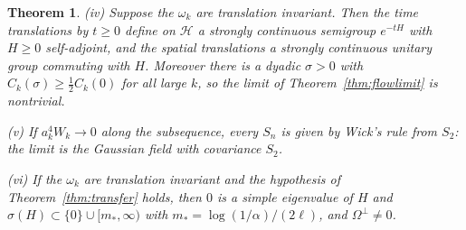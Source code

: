 \documentclass[aps,prd,twocolumn,superscriptaddress,nofootinbib,longbibliography,floatfix,amsmath,amssymb,10pt]{revtex4-2}
\newtheorem{theorem}{Theorem}
\theoremstyle{definition}
\theoremstyle{remark}
\begin{document}
\begin{theorem}
\textup{(iv)} Suppose the $\omega_k$ are translation invariant. Then the
time translations by $t\ge0$ define on $\mathcal H$ a strongly continuous
semigroup $e^{-tH}$ with $H\ge0$ self-adjoint, and the spatial translations a
strongly continuous unitary group commuting with $H$. Moreover there is a
dyadic $\sigma>0$ with $C_k(\sigma)\ge\frac12C_k(0)$ for all large $k$, so
the limit of Theorem~\textup{\ref{thm:flowlimit}} is nontrivial.

\textup{(v)} If $a_k^4W_k\to0$ along the subsequence, every $S_n$ is given by
Wick's rule from $S_2$: the limit is the Gaussian field with covariance $S_2$.

\textup{(vi)} If the $\omega_k$ are translation invariant and the
hypothesis of Theorem~\textup{\ref{thm:transfer}} holds, then $0$ is a simple
eigenvalue of $H$ and $\sigma(H)\subset\{0\}\cup[m_*,\infty)$ with
$m_*=\log(1/\alpha)/(2\ell)$, and $\Omega^\perp\ne0$.
\end{theorem}
\end{document}

